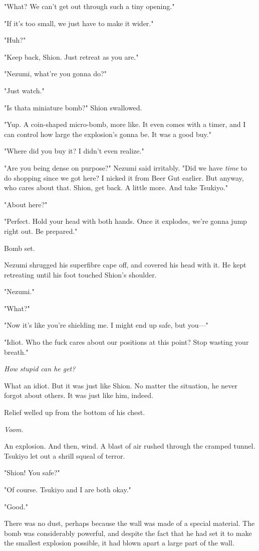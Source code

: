 "What? We can't get out through such a tiny opening."

"If it's too small, we just have to make it wider."

"Huh?"

"Keep back, Shion. Just retreat as you are."

"Nezumi, what're you gonna do?"

"Just watch."

"Is that\el a miniature bomb?" Shion swallowed.

"Yup. A coin-shaped micro-bomb, more like. It even comes with a timer,
and I can control how large the explosion's gonna be. It was a good
buy."

"Where did you buy it? I didn't even realize."

"Are you being dense on purpose?" Nezumi said irritably. "Did we have
\emph{time} to do shopping since we got here? I nicked it from Beer Gut
earlier. But anyway, who cares about that. Shion, get back. A little
more. And take Tsukiyo."

"About here?"

"Perfect. Hold your head with both hands. Once it explodes, we're gonna
jump right out. Be prepared."

Bomb set.

Nezumi shrugged his superfibre cape off, and covered his head with it.
He kept retreating until his foot touched Shion's shoulder.

"Nezumi."

"What?"

"Now it's like you're shielding me. I might end up safe, but you---"

"Idiot. Who the fuck cares about our positions at this point? Stop
wasting your breath."

\emph{How stupid can he get?}

What an idiot. But it was just like Shion. No matter the situation, he
never forgot about others. It was just like him, indeed.

Relief welled up from the bottom of his chest.

\emph{Voom.}

An explosion. And then, wind. A blast of air rushed through the cramped
tunnel. Tsukiyo let out a shrill squeal of terror.

"Shion! You safe?"

"Of course. Tsukiyo and I are both okay."

"Good."

There was no dust, perhaps because the wall was made of a special
material. The bomb was considerably powerful, and despite the fact that
he had set it to make the smallest explosion possible, it had blown
apart a large part of the wall.

